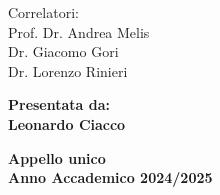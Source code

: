 \begin{titlepage}
\begin{minipage}[t]{0.47\textwidth}
{{\vspace{5mm} %
Correlatori:\\
Prof. Dr. Andrea Melis\\
Dr. Giacomo Gori\\
Dr. Lorenzo Rinieri\\
}}
\end{minipage}
\hfill
\begin{minipage}[t]{0.47\textwidth}\raggedleft
{\normalsize{\bf Presentata da:\\
Leonardo Ciacco}}
\end{minipage}
\vspace{0.5mm} %
\begin{center}
{\normalsize{\bf Appello unico\\%
Anno Accademico 2024/2025}}%
\end{center}
\end{titlepage}
